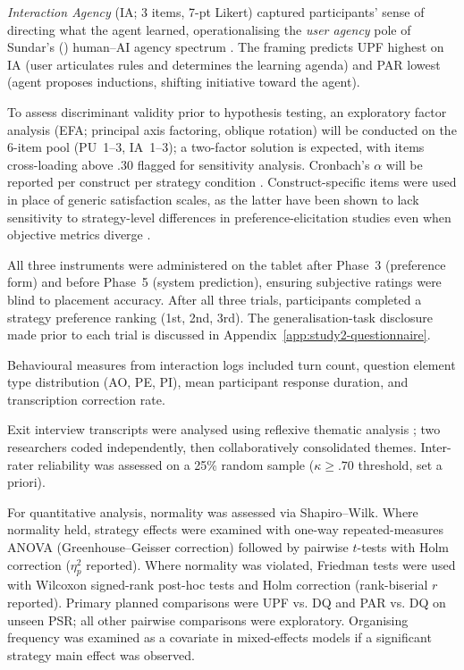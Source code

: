 \documentclass[manuscript,review,anonymous]{acmart}
\begin{document}
\textit{Interaction Agency} (IA; 3 items, 7-pt Likert) captured participants' sense of directing what the agent learned, operationalising the \textit{user agency} pole of Sundar's (\citeyear{sundar2020agency}) human--AI agency spectrum \citep[cf.][]{bergstrom2022tochi,chen2024crsque}. The framing predicts UPF highest on IA (user articulates rules and determines the learning agenda) and PAR lowest (agent proposes inductions, shifting initiative toward the agent).

To assess discriminant validity prior to hypothesis testing, an exploratory factor analysis (EFA; principal axis factoring, oblique rotation) will be conducted on the 6-item pool (PU~1--3, IA~1--3); a two-factor solution is expected, with items cross-loading above .30 flagged for sensitivity analysis. Cronbach's $\alpha$ will be reported per construct per strategy condition \citep{schrum2023likert}. Construct-specific items were used in place of generic satisfaction scales, as the latter have been shown to lack sensitivity to strategy-level differences in preference-elicitation studies even when objective metrics diverge \citep{XXX2024ijhcs}. %

All three instruments were administered on the tablet after Phase~3 (preference form) and before Phase~5 (system prediction), ensuring subjective ratings were blind to placement accuracy. After all three trials, participants completed a strategy preference ranking (1st, 2nd, 3rd). The generalisation-task disclosure made prior to each trial is discussed in Appendix~\ref{app:study2-questionnaire}.

Behavioural measures from interaction logs included turn count, question element type distribution (AO, PE, PI), mean participant response duration, and transcription correction rate.

Exit interview transcripts were analysed using reflexive thematic analysis \citep{braun2006using}; two researchers coded independently, then collaboratively consolidated themes. Inter-rater reliability was assessed on a 25\% random sample ($\kappa \geq .70$ threshold, set a priori).

For quantitative analysis, normality was assessed via Shapiro--Wilk. Where normality held, strategy effects were examined with one-way repeated-measures ANOVA (Greenhouse--Geisser correction) followed by pairwise $t$-tests with Holm correction ($\eta^2_p$ reported). Where normality was violated, Friedman tests were used with Wilcoxon signed-rank post-hoc tests and Holm correction (rank-biserial $r$ reported). Primary planned comparisons were UPF vs. DQ and PAR vs. DQ on unseen PSR; all other pairwise comparisons were exploratory. Organising frequency was examined as a covariate in mixed-effects models if a significant strategy main effect was observed.
\end{document}
